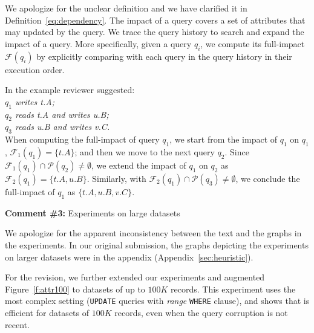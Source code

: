 We apologize for the unclear definition and we have clarified it in Definition~\ref{eq:dependency}.
The impact of a query covers a set of attributes that may updated by 
the query. We trace the query 
history to search and expand the impact of a query. More specifically, given a query 
$q_i$, we compute its full-impact $\mathcal{F}(q_i)$ by explicitly 
comparing with each query in the query history in their execution order. 

\noindent In the example reviewer suggested:\\
\textit{\indent $q_1$ writes t.A; \\
\indent $q_2$ reads t.A and writes u.B; \\
\indent $q_3$ reads u.B and writes v.C.}\\
When computing the full-impact of query $q_1$, we start from the impact of $q_1$
on $q_1$, $\mathcal{F}_1(q_1) = \{t.A\}$; and then we move to the next query $q_2$. 
Since $\mathcal{F}_1(q_1)  \cap\mathcal{P}(q_2) \neq \emptyset$, we extend the impact 
of $q_1$ on $q_2$ as $\mathcal{F}_2(q_1) = \{t.A, u.B\}$. Similarly, with 
$\mathcal{F}_2(q_1)  \cap\mathcal{P}(q_3) \neq \emptyset$, we conclude the full-impact
of $q_1$ as $\{t.A, u.B, v.C\}$.


\comskip

\noindent
\textbf{Comment \#3:} Experiments on large datasets
\begin{quote}
\end{quote}

We apologize for the apparent inconsistency between the text and the graphs in
the experiments. In our original submission, the graphs depicting the
experiments on larger datasets were in the appendix
(Appendix~\ref{sec:heuristic}).

For the revision, we further extended our experiments and augmented
Figure~\ref{f:attr100} to datasets of up to $100K$ records. This experiment
uses the most complex setting (\texttt{UPDATE} queries with \textit{range}
\texttt{WHERE} clause), and shows that \sys is efficient for datasets of
$100K$ records, even when the query corruption is not recent.


